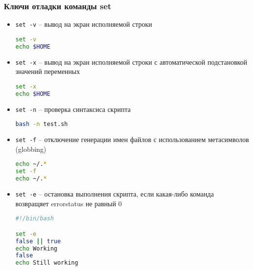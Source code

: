 \begin{frame}
	\frametitle{Ключи отладки команды set}

	\begin{itemize}
		\item {\tt set -v} -- вывод на экран исполняемой строки
			\begin{lstlisting}[language=sh,frame=single]
set -v
echo $HOME
\end{lstlisting}

		\item {\tt set -x} -- вывод на экран исполняемой строки с автоматической подстановкой значений переменных
\begin{lstlisting}[language=sh,frame=single]
set -x
echo $HOME
\end{lstlisting}

		\item {\tt set -n} -- проверка синтаксиса скрипта
\begin{lstlisting}[language=sh,frame=single]
bash -n test.sh
\end{lstlisting} 

		\framebreak
		\item {\tt set -f} -- отключение генерации имен файлов с использованием метасимволов (globbing)
\begin{lstlisting}[language=sh,frame=single]
echo ~/.*
set -f
echo ~/.*
\end{lstlisting} 
		\framebreak
		\item {\tt set -e} -- остановка выполнения скрипта, если какая-либо команда 
		возвращяет errorstatus не равный 0
\begin{lstlisting}[language=sh,frame=single]
#!/bin/bash

set -e
false || true
echo Working
false
echo Still working
\end{lstlisting} 
	\end{itemize}
\end{frame}
